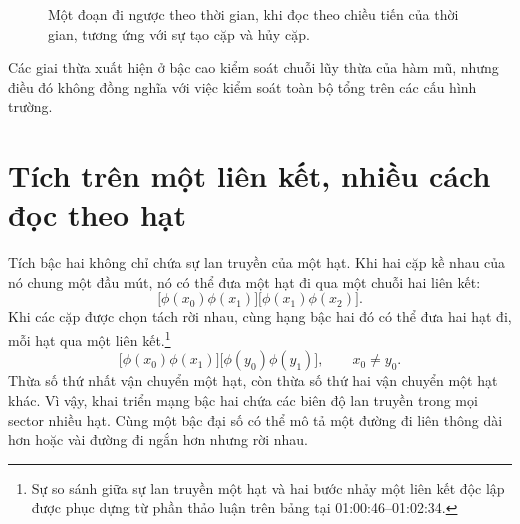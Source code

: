 \begin{figure}[htbp]
\centering
{}
\caption{Một đoạn đi ngược theo thời gian, khi đọc theo chiều tiến của thời gian, tương ứng với sự tạo cặp và hủy cặp.}
\end{figure}

Các giai thừa xuất hiện ở bậc cao kiểm soát chuỗi lũy thừa của hàm mũ, nhưng điều đó không đồng nghĩa với việc kiểm soát toàn bộ tổng trên các cấu hình trường.

\begin{classroomqa}
\end{classroomqa}

\section{Tích trên một liên kết, nhiều cách đọc theo hạt}

Tích bậc hai không chỉ chứa sự lan truyền của một hạt. Khi hai cặp kề nhau của nó chung một đầu mút, nó có thể đưa một hạt đi qua một chuỗi hai liên kết:
\begin{equation}
\bigl[\phi(x_0)\phi(x_1)\bigr]
\bigl[\phi(x_1)\phi(x_2)\bigr].
\end{equation}
Khi các cặp được chọn tách rời nhau, cùng hạng bậc hai đó có thể đưa hai hạt đi, mỗi hạt qua một liên kết.\footnote{Sự so sánh giữa sự lan truyền một hạt và hai bước nhảy một liên kết độc lập được phục dựng từ phần thảo luận trên bảng tại 01:00:46--01:02:34.}
\begin{equation}
\bigl[\phi(x_0)\phi(x_1)\bigr]
\bigl[\phi(y_0)\phi(y_1)\bigr],
\qquad x_0\neq y_0.
\end{equation}
Thừa số thứ nhất vận chuyển một hạt, còn thừa số thứ hai vận chuyển một hạt khác. Vì vậy, khai triển mạng bậc hai chứa các biên độ lan truyền trong mọi sector nhiều hạt. Cùng một bậc đại số có thể mô tả một đường đi liên thông dài hơn hoặc vài đường đi ngắn hơn nhưng rời nhau.

